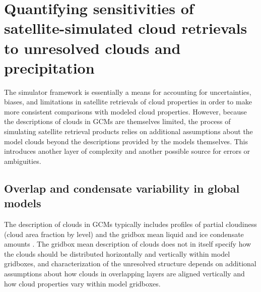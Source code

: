 \chapter{Quantifying sensitivities of satellite-simulated cloud retrievals to unresolved clouds and precipitation}\label{sg_chapter}

The simulator framework is essentially a means for accounting for uncertainties, biases, and limitations in satellite retrievals of cloud properties in order to make more consistent comparisons with modeled cloud properties. However, because the descriptions of clouds in GCMs are themselves limited, the process of simulating satellite retrieval products relies on additional assumptions about the model clouds beyond the descriptions provided by the models themselves. This introduces another layer of complexity and another possible source for errors or ambiguities.


\section{Overlap and condensate variability in global models}
The description of clouds in GCMs typically includes profiles of partial cloudiness (cloud area fraction by level) and the gridbox mean liquid and ice condensate amounts \citep[e.g.,][]{collins_et_al_2004,neale_et_al_2010a}. The gridbox mean description of clouds does not in itself specify how the clouds should be distributed horizontally and vertically within model gridboxes, and characterization of the unresolved structure depends on additional assumptions about how clouds in overlapping layers are aligned vertically and how cloud properties vary within model gridboxes.

